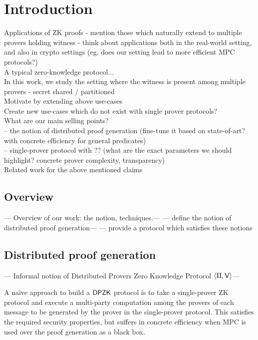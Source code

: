 \section{Introduction} \label{sec:intro}
Applications of ZK proofs - mention those which naturally extend to multiple provers holding witness - think about applications both in the real-world setting, and also in crypto settings (eg. does our setting lead to more efficient MPC protocols?)\\

A typical zero-knowledge protocol...\\
In this work, we study the setting where the witness is present among multiple provers - secret shared / partitioned \\
Motivate by extending above use-cases\\
Create new use-cases which do not exist with single prover protocols?\\

What are our main selling points?\\
-- the notion of distributed proof generation (fine-tune it based on state-of-art? with concrete efficiency for general predicates)\\
-- single-prover protocol with ?? (what are the exact parameters we should highlight? concrete prover complexity, transparency)\\

Related work for the above mentioned claims\\

\subsection{Overview}
--- Overview of our work: the notion, techniques.--- 
--- define the notion of distributed proof generation--- 
--- provide a protocol which satisfies these notions

\subsection*{Distributed proof generation}
--- Informal notion of Distributed Provers Zero Knowledge Protocol $\langle \Pi,\mathsf{V}\rangle$--- 

A na\"ive approach to build a $\mathsf{DPZK}$ protocol is to take a single-prover ZK protocol and execute a multi-party computation among the provers of each message to be generated by the prover in the single-prover protocol. This satisfies the required security properties, but suffers in concrete efficiency when MPC is used over the proof generation as a black box. 


